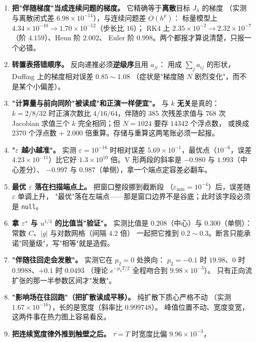 \begin{enumerate}
  \item \textbf{把"伴随梯度"当成连续问题的梯度。} 它精确等于\textbf{离散}目标 $J_h$ 的梯度
        （实测与离散闭式差 $6.98\times10^{-14}$），与连续问题差 $O(h^p)$：
        标量模型上 $4.34\times10^{-10}\to1.70\times10^{-12}$（步长比 $16$）；
        RK4 上 $2.35\times10^{-2}\to2.32\times10^{-7}$（阶 $4.159$）、Heun 阶 $2.002$、
        Euler 阶 $0.998$。两个都报才算说清楚，只报一个必错。
  \item \textbf{转置表搭错顺序。} 反向递推必须\textbf{逆级序}且用 $a_{ji}$：
        用成 $\sum_j a_{ij}$ 的形状，Duffing 上的梯度相对误差 $0.85\sim1.08$
        （症状是"梯度随 $N$ 剧烈变化"，而不是某个小偏差）。
  \item \textbf{"计算量与前向同阶"被读成"和正演一样便宜"。} 与 $k$ \textbf{无关}是真的：
        $k=2/8/32$ 时正演次数比 $4/16/64$，伴随的 $385$ 次残差求值与 $768$ 次
        Jacobian 求值三个 $k$ 完全相同；但 $N=1024$ 要存 $14342$ 个浮点数，
        或换成 $2370$ 个浮点数 $+$ $2.000$ 倍重算。存储与重算这两笔账必须一起报。
  \item \textbf{"$\varepsilon$ 越小越准"。} 实测 $\varepsilon=10^{-16}$ 时相对误差
        $5.69\times10^{-1}$，最优点（$10^{-6}$，误差 $4.23\times10^{-11}$）比它好
        $1.3\times10^{10}$ 倍。V 形两段的斜率是 $-0.980$ 与 $1.993$（中心差分）、
        $-0.997$ 与 $0.987$（单侧），拿一个端点定容差必翻车。
  \item \textbf{最优 $\varepsilon$ 落在扫描端点上。} 把窗口整段挪到截断段
        （$\varepsilon_{\min}=10^{-4}$）后，误差随 $\varepsilon$ 单调上升，
        "最优"落在左端点——那是窗口边界不是谷底；此时该字段必须是 \texttt{null}。
  \item \textbf{拿 $\varepsilon^\star$ 与 $u^{1/3}$ 的比值当"验证"。} 实测比值是
        $0.208$（中心）与 $0.300$（单侧）：常数 $C$、$|g|$ 与对数网格（间隔 $4.2$ 倍）
        一起把它推到 $0.2\sim0.3$。断言只能承诺"同量级"，写"相等"就是造假。
  \item \textbf{"伴随往回走会发散"。} 实测它在 $p_2=0$ 处换向：
        $p_2=-0.1$ 时 $19.98$、$0$ 时 $0.9988$、$+0.1$ 时 $0.0493$
        （理论 $e^{-p_2T/2}$ 全程吻合到 $9.98\times10^{-3}$）。
        只有正向流扩张的那一半参数区间才"发散"。
  \item \textbf{"影响场在往回跑"（把扩散读成平移）。} 纯扩散下质心严格不动
        （实测 $1.67\times10^{-16}$），长的是宽度（斜率比 $0.999748$）。
        峰值位置不动、宽度变宽，这两件事在热力图上容易看反。
  \item \textbf{把连续宽度律外推到触壁之后。} $\tau=T$ 时宽度比偏 $9.96\times10^{-3}$，

\end{enumerate}
